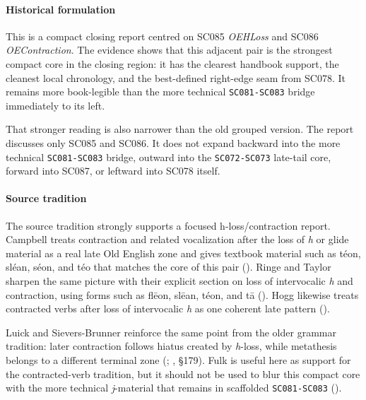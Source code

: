\documentclass[
  british,
  a4paper,
]{article}
\begin{document}
\paragraph{Historical formulation}\label{historical-formulation-51}

This is a compact closing report centred on SC085 \emph{OEHLoss} and
SC086 \emph{OEContraction}. The evidence shows that this adjacent pair
is the strongest compact core in the closing region: it has the clearest
handbook support, the cleanest local chronology, and the best-defined
right-edge seam from SC078. It remains more book-legible than the more
technical \texttt{SC081-SC083} bridge immediately to its left.

That stronger reading is also narrower than the old grouped version. The
report discusses only SC085 and SC086. It does not expand backward into
the more technical \texttt{SC081-SC083} bridge, outward into the
\texttt{SC072-SC073} late-tail core, forward into SC087, or leftward
into SC078 itself.

\paragraph{Source tradition}\label{source-tradition-51}

The source tradition strongly supports a focused h-loss/contraction
report. Campbell treats contraction and related vocalization after the
loss of \emph{h} or glide material as a real late Old English zone and
gives textbook material such as téon, sléan, séon, and téo that matches
the core of this pair (). Ringe and Taylor sharpen the same picture
with their explicit section on loss of intervocalic \emph{h} and
contraction, using forms such as flēon, slēan, téon, and tā
(). Hogg likewise treats contracted verbs after loss of
intervocalic \emph{h} as one coherent late pattern
().

Luick and Sievers-Brunner reinforce the same point from the older
grammar tradition: later contraction follows hiatus created by
\emph{h}-loss, while metathesis belongs to a different terminal zone
(;
, §179).
Fulk is useful here as support for the contracted-verb tradition, but it
should not be used to blur this compact core with the more technical
\emph{j}-material that remains in scaffolded \texttt{SC081-SC083}
().
\end{document}
